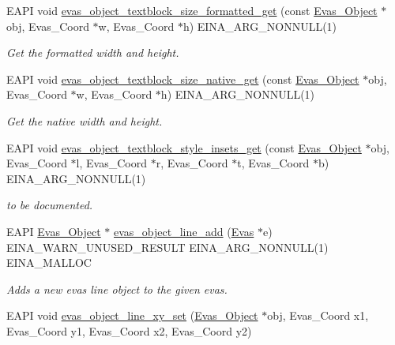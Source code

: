 \begin{DoxyCompactItemize}
EAPI void \hyperlink{group__Evas__Object__Textblock_ga5b77e11b6e478b81ed13d469cb8e21db}{evas\_\-object\_\-textblock\_\-size\_\-formatted\_\-get} (const \hyperlink{group__Evas__Object__Group_ga9e19e6dd1f517a0ba437c0114d3e7c97}{Evas\_\-Object} $\ast$obj, Evas\_\-Coord $\ast$w, Evas\_\-Coord $\ast$h) EINA\_\-ARG\_\-NONNULL(1)
\begin{DoxyCompactList}\small\item\em Get the formatted width and height. \item\end{DoxyCompactList}\item 
EAPI void \hyperlink{group__Evas__Object__Textblock_ga9a956c2712537a1e1f83e997c79a4c1e}{evas\_\-object\_\-textblock\_\-size\_\-native\_\-get} (const \hyperlink{group__Evas__Object__Group_ga9e19e6dd1f517a0ba437c0114d3e7c97}{Evas\_\-Object} $\ast$obj, Evas\_\-Coord $\ast$w, Evas\_\-Coord $\ast$h) EINA\_\-ARG\_\-NONNULL(1)
\begin{DoxyCompactList}\small\item\em Get the native width and height. \item\end{DoxyCompactList}\item 
EAPI void \hyperlink{group__Evas__Object__Textblock_ga851cb385b547a958790a0d60d386a1d8}{evas\_\-object\_\-textblock\_\-style\_\-insets\_\-get} (const \hyperlink{group__Evas__Object__Group_ga9e19e6dd1f517a0ba437c0114d3e7c97}{Evas\_\-Object} $\ast$obj, Evas\_\-Coord $\ast$l, Evas\_\-Coord $\ast$r, Evas\_\-Coord $\ast$t, Evas\_\-Coord $\ast$b) EINA\_\-ARG\_\-NONNULL(1)
\begin{DoxyCompactList}\small\item\em to be documented. \item\end{DoxyCompactList}\item 
EAPI \hyperlink{group__Evas__Object__Group_ga9e19e6dd1f517a0ba437c0114d3e7c97}{Evas\_\-Object} $\ast$ \hyperlink{group__Evas__Line__Group_ga896f1beaea24379495af4cbc5efcebfe}{evas\_\-object\_\-line\_\-add} (\hyperlink{group__Evas__Canvas_ga5ff87cc4ce6bc43e3b640a6d37f73043}{Evas} $\ast$e) EINA\_\-WARN\_\-UNUSED\_\-RESULT EINA\_\-ARG\_\-NONNULL(1) EINA\_\-MALLOC
\begin{DoxyCompactList}\small\item\em Adds a new evas line object to the given evas. \item\end{DoxyCompactList}\item 
EAPI void \hyperlink{group__Evas__Line__Group_gaa43185929e6e41e9c7315d2230665174}{evas\_\-object\_\-line\_\-xy\_\-set} (\hyperlink{group__Evas__Object__Group_ga9e19e6dd1f517a0ba437c0114d3e7c97}{Evas\_\-Object} $\ast$obj, Evas\_\-Coord x1, Evas\_\-Coord y1, Evas\_\-Coord x2, Evas\_\-Coord y2)

\end{DoxyCompactItemize}
